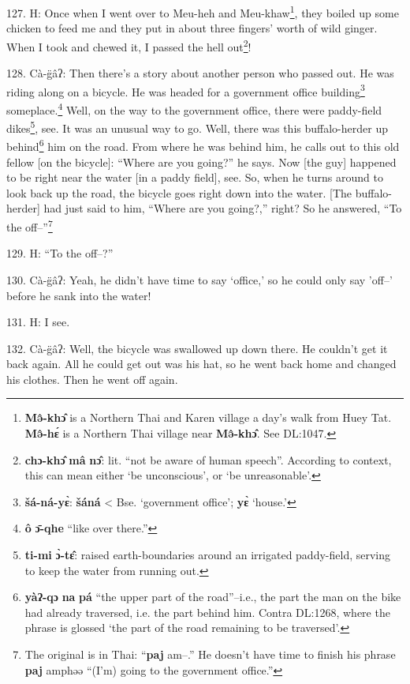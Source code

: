 127. H: Once when I went over to Meu-heh and Meu-khaw\footnote{\textbf{Mə̂-khɔ̂} is a Northern Thai and Karen village a day's walk from Huey Tat. \textbf{Mə̂-hɛ́} is a Northern Thai village near \textbf{Mə̂-khɔ̂}. See DL:1047.}, they boiled up some
chicken to feed me and they put in about three fingers' worth of wild ginger. When
I took and chewed it, I passed the hell out\footnote{\textbf{chɔ-khɔ̂} \textbf{mâ} \textbf{nɔ̂}: lit. ``not be aware of human speech''. According to context, this can mean either `be unconscious', or `be unreasonable'.}!

\begin{center}
\end{center}

128. Cà-g̈âʔ: Then there's a story about another person who passed out. He was
riding along on a bicycle. He was headed for a government office building\footnote{\textbf{šá-ná-yɛ̀}: \textbf{šáná} < Bse. `government office'; \textbf{yɛ̀} `house.'}
someplace.\footnote{\textbf{ô} \textbf{ɔ̄-qhe} ``like over there.''} Well, on the way to the government office, there were paddy-field
dikes\footnote{\textbf{ti-mi} \textbf{ɔ̀-tɛ̂}: raised earth-boundaries around an irrigated paddy-field, serving to keep the water from running out.}, see. It was an unusual way to go. Well, there was this buffalo-herder
up behind\footnote{\textbf{yàʔ-qɔ} \textbf{na} \textbf{pá} ``the upper part of the road''--i.e., the part the man on the bike had already traversed, i.e. the part behind him. Contra DL:1268, where the phrase is glossed `the part of the road remaining to be traversed'.} him on the road. From where he was behind him, he calls out to this
old fellow [on the bicycle]: ``Where are you going?'' he says.
Now [the guy] happened to be right near the water [in a paddy field], see. So,
when he turns around to look back up the road, the bicycle goes right down into
the water. [The buffalo-herder] had just said to him, ``Where are you going?,''
right? So he answered, ``To the off--''\footnote{The original is in Thai: ``\textbf{paj} am--.'' He doesn't have time to finish his phrase \textbf{paj} amphəə ``(I'm) going to the government office.''}

129. H: ``To the off--?''

130. Cà-g̈âʔ: Yeah, he didn't have time to say `office,' so he could only say
'off--' before he sank into the water!

131. H: I see.

132. Cà-g̈âʔ: Well, the bicycle was swallowed up down there. He couldn't get
it back again. All he could get out was his hat, so he went back home and changed
his clothes. Then he went off again.

